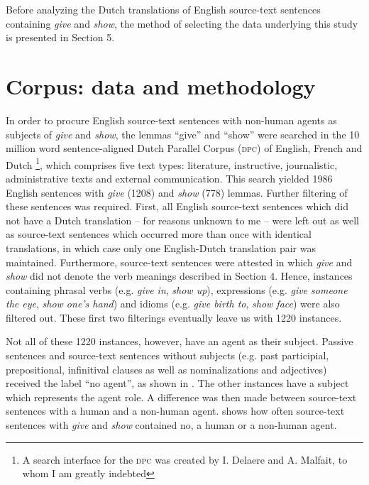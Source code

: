 \documentclass[output=paper]{LSP/langsci}
\begin{document}
Before analyzing the Dutch translations of English source-text sentences containing \textit{give} and \textit{show}, the method of selecting the data underlying this study is presented in Section 5.

\section{Corpus: data and methodology}

In order to procure English source-text sentences with non-human agents as subjects of \textit{give} and \textit{show}, the lemmas “give” and “show” were searched in the 10 million word sentence-aligned Dutch Parallel Corpus (\textsc{dpc}) of English, French and Dutch \citep[see e.g.][]{Rura2008}\footnote{A search interface for the \textsc{dpc} was created by I. Delaere and A. Malfait, to whom I am greatly indebted}, which comprises five text types: literature, instructive, journalistic, administrative texts and external communication. This search yielded 1986 English sentences with \textit{give} (1208) and \textit{show} (778) lemmas. Further filtering of these sentences was required. First, all English source-text sentences which did not have a Dutch translation – for reasons unknown to me – were left out as well as source-text sentences which occurred more than once with identical translations, in which case only one English-Dutch translation pair was maintained. Furthermore, source-text sentences were attested in which \textit{give} and \textit{show} did not denote the verb meanings described in Section 4. Hence, instances containing phrasal verbs (e.g. \textit{give in}, \textit{show up}), expressions (e.g. \textit{give someone the eye}, \textit{show one’s hand}) and idioms (e.g. \textit{give birth to}, \textit{show face}) were also filtered out. These first two filterings eventually leave us with 1220 instances.

Not all of these 1220 instances, however, have an agent as their subject. Passive sentences and source-text sentences without subjects (e.g. past participial, prepositional, infinitival clauses as well as nominalizations and adjectives) received the label “no agent”, as shown in . The other instances have a subject which represents the agent role. A difference was then made between source-text sentences with a human and a non-human agent.  shows how often source-text sentences with \textit{give} and \textit{show} contained no, a human or a non-human agent.     
\end{document}
